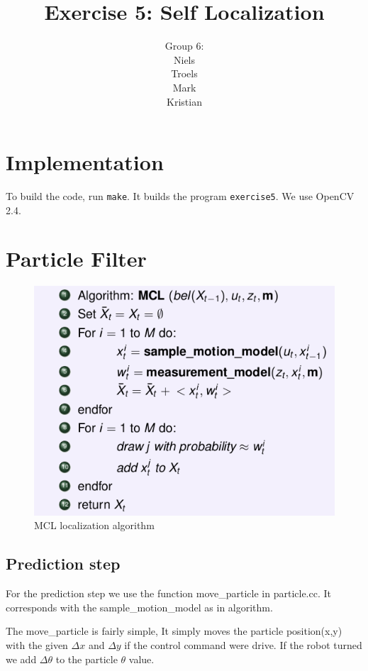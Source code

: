 \documentclass[a4paper,12pt]{article}
\title{Exercise 5: Self Localization}
\author{Group 6:\\Niels\\Troels\\Mark\\Kristian}
\begin{document}
\maketitle
\newpage
\section{Implementation}

To build the code, run \texttt{make}.  It builds the program
\texttt{exercise5}.  We use OpenCV 2.4.


\section{Particle Filter}

\begin{figure}[!h]
\centering
\includegraphics[scale=0.50]{MCL.png}
\caption{MCL localization algorithm}
\label{MCL}
\end{figure}

\subsection{Prediction step}

For the prediction step we use the function move_particle in particle.cc. It corresponds with the sample_motion_model as in algorithm. 

The move_particle is fairly simple, It simply moves the particle position(x,y) with the given $\Delta x $ and $\Delta y$ if the control command were drive. If the robot turned we add $\Delta \theta$ to the particle $\theta$ value. 
\end{document}
